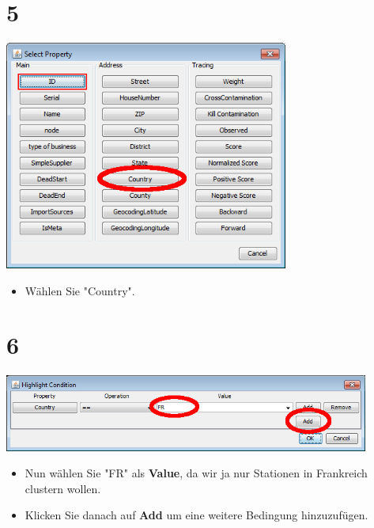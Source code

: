 \documentclass{beamer}
\begin{document}
\section{5}
\begin{frame}
	\begin{center}
  		\includegraphics[width=0.7\textwidth]{5.png}
	\end{center}
	\begin{itemize}
		\item Wählen Sie "Country".
	\end{itemize}
\end{frame}

\section{6}
\begin{frame}
	\begin{center}
  		\includegraphics[width=0.9\textwidth]{6.png}
	\end{center}
	\begin{itemize}
		\item Nun wählen Sie "FR" als \textbf{Value}, da wir ja nur Stationen in Frankreich clustern wollen.
		\item Klicken Sie danach auf \textbf{Add} um eine weitere Bedingung hinzuzufügen.
	\end{itemize}
\end{frame}
\end{document}
